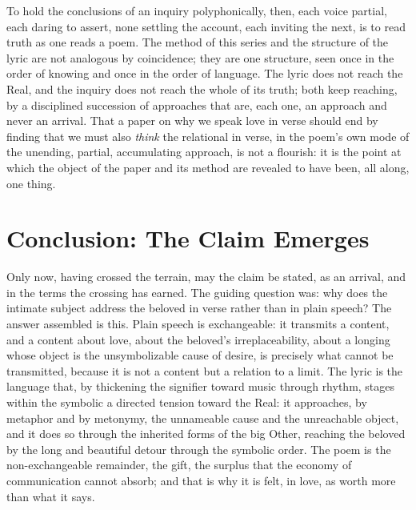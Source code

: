 To hold the conclusions of an inquiry polyphonically, then, each voice partial, each daring to assert, none settling the account, each inviting the next, is to read truth as one reads a poem. The method of this series and the structure of the lyric are not analogous by coincidence; they are one structure, seen once in the order of knowing and once in the order of language. The lyric does not reach the Real, and the inquiry does not reach the whole of its truth; both keep reaching, by a disciplined succession of approaches that are, each one, an approach and never an arrival. That a paper on why we speak love in verse should end by finding that we must also \emph{think} the relational in verse, in the poem's own mode of the unending, partial, accumulating approach, is not a flourish: it is the point at which the object of the paper and its method are revealed to have been, all along, one thing.

\section{Conclusion: The Claim Emerges}\label{p08:sec:conclusion}

Only now, having crossed the terrain, may the claim be stated, as an arrival, and in the terms the crossing has earned. The guiding question was: why does the intimate subject address the beloved in verse rather than in plain speech? The answer assembled is this. Plain speech is exchangeable: it transmits a content, and a content about love, about the beloved's irreplaceability, about a longing whose object is the unsymbolizable cause of desire, is precisely what cannot be transmitted, because it is not a content but a relation to a limit. The lyric is the language that, by thickening the signifier toward music through rhythm, stages within the symbolic a directed tension toward the Real: it approaches, by metaphor and by metonymy, the unnameable cause and the unreachable object, and it does so through the inherited forms of the big Other, reaching the beloved by the long and beautiful detour through the symbolic order. The poem is the non-exchangeable remainder, the gift, the surplus that the economy of communication cannot absorb; and that is why it is felt, in love, as worth more than what it says.

